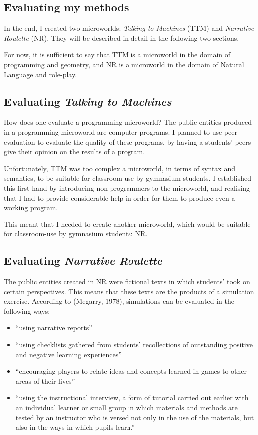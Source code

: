 \subsection{Evaluating my methods}

In the end, I created two microworlds: \textit{Talking to Machines} (TTM) and \textit{Narrative Roulette} (NR). They will be described in detail in the following two sections. 

For now, it is sufficient to say that TTM is a microworld in the domain of programming and geometry, and NR is a microworld in the domain of Natural Language and role-play.

\subsection{Evaluating \textit{Talking to Machines}}

How does one evaluate a programming microworld? The public entities produced in a programming microworld are computer programs. I planned to use peer-evaluation to evaluate the quality of these programs, by having a students' peers give their opinion on the results of a program.

Unfortunately, TTM was too complex a microworld, in terms of syntax and semantics, to be suitable for classroom-use by gymnasium students. I established this first-hand by introducing non-programmers to the microworld, and realising that I had to provide considerable help in order for them to produce even a working program.

This meant that I needed to create another microworld, which would be suitable for classroom-use by gymnasium students: NR.

\subsection{Evaluating \textit{Narrative Roulette}}

The public entities created in NR were fictional texts in which students' took on certain perspectives. This means that these texts are the products of a simulation exercise. According to (Megarry, 1978)\cite[p187-207]{megarry}, simulations can be evaluated in the following ways:

\begin{itemize} 
  \item ``using narrative reports''
  \item ``using checklists gathered from students' recollections of outstanding positive and negative learning experiences''
  \item ``encouraging players to relate ideas and concepts learned in games to other areas of their lives''
  \item ``using the instructional interview, a form of tutorial carried out earlier with an individual learner or small group in which materials and methods are tested by an instructor who is versed not only in the use of the materials, but also in the ways in which pupils learn.''
\end{itemize}


